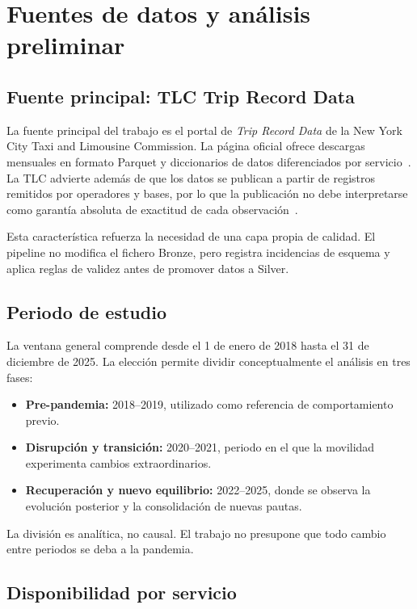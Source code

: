 \chapter{Fuentes de datos y análisis preliminar}\label{chap:datos}

\section{Fuente principal: TLC Trip Record Data}

La fuente principal del trabajo es el portal de \textit{Trip Record Data} de la New York City Taxi and Limousine Commission. La página oficial ofrece descargas mensuales en formato Parquet y diccionarios de datos diferenciados por servicio~\cite{nyctlc_tripdata}. La TLC advierte además de que los datos se publican a partir de registros remitidos por operadores y bases, por lo que la publicación no debe interpretarse como garantía absoluta de exactitud de cada observación~\cite{nyctlc_reports}.

Esta característica refuerza la necesidad de una capa propia de calidad. El pipeline no modifica el fichero Bronze, pero registra incidencias de esquema y aplica reglas de validez antes de promover datos a Silver.

\section{Periodo de estudio}

La ventana general comprende desde el 1 de enero de 2018 hasta el 31 de diciembre de 2025. La elección permite dividir conceptualmente el análisis en tres fases:

\begin{itemize}
\item \textbf{Pre-pandemia:} 2018--2019, utilizado como referencia de comportamiento previo.
\item \textbf{Disrupción y transición:} 2020--2021, periodo en el que la movilidad experimenta cambios extraordinarios.
\item \textbf{Recuperación y nuevo equilibrio:} 2022--2025, donde se observa la evolución posterior y la consolidación de nuevas pautas.
\end{itemize}

La división es analítica, no causal. El trabajo no presupone que todo cambio entre periodos se deba a la pandemia.

\section{Disponibilidad por servicio}

